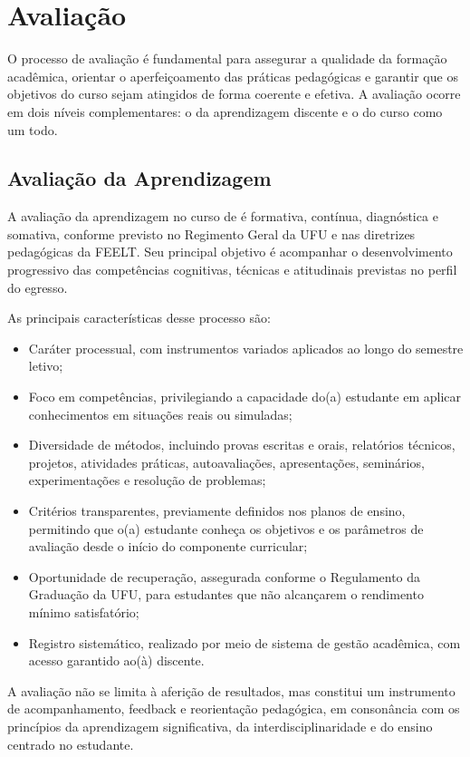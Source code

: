 \chapter{Avaliação}

O processo de avaliação é fundamental para assegurar a qualidade da formação acadêmica, orientar o aperfeiçoamento das práticas pedagógicas e garantir que os objetivos do curso sejam atingidos de forma coerente e efetiva. A avaliação ocorre em dois níveis complementares: o da aprendizagem discente e o do curso como um todo.

\section{Avaliação da Aprendizagem}

A avaliação da aprendizagem no curso de \ppccurso é formativa, contínua, diagnóstica e somativa, conforme previsto no Regimento Geral da UFU e nas diretrizes pedagógicas da FEELT. Seu principal objetivo é acompanhar o desenvolvimento progressivo das competências cognitivas, técnicas e atitudinais previstas no perfil do egresso.

As principais características desse processo são:

\begin{itemize}
    \item Caráter processual, com instrumentos variados aplicados ao longo do semestre letivo;
    \item Foco em competências, privilegiando a capacidade do(a) estudante em aplicar conhecimentos em situações reais ou simuladas;
    \item Diversidade de métodos, incluindo provas escritas e orais, relatórios técnicos, projetos, atividades práticas, autoavaliações, apresentações, seminários, experimentações e resolução de problemas;
    \item Critérios transparentes, previamente definidos nos planos de ensino, permitindo que o(a) estudante conheça os objetivos e os parâmetros de avaliação desde o início do componente curricular;
    \item Oportunidade de recuperação, assegurada conforme o Regulamento da Graduação da UFU, para estudantes que não alcançarem o rendimento mínimo satisfatório;
    \item Registro sistemático, realizado por meio de sistema de gestão acadêmica, com acesso garantido ao(à) discente.
\end{itemize}

A avaliação não se limita à aferição de resultados, mas constitui um instrumento de acompanhamento, feedback e reorientação pedagógica, em consonância com os princípios da aprendizagem significativa, da interdisciplinaridade e do ensino centrado no estudante.

